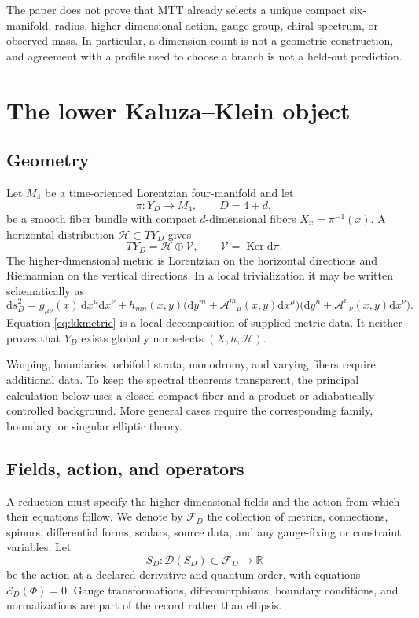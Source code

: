 \documentclass[11pt]{article}
\theoremstyle{definition}
\theoremstyle{remark}
\newcommand{\dd}{\mathrm d}
\newcommand{\cA}{\mathcal A}
\newcommand{\cD}{\mathcal D}
\newcommand{\cE}{\mathcal E}
\newcommand{\cF}{\mathcal F}
\newcommand{\cH}{\mathcal H}
\newcommand{\cV}{\mathcal V}
\newcommand{\Ker}{\operatorname{Ker}}
\begin{document}
The paper does not prove that MTT already selects a unique compact
six-manifold, radius, higher-dimensional action, gauge group, chiral
spectrum, or observed mass.  In particular, a dimension count is not a
geometric construction, and agreement with a profile used to choose a
branch is not a held-out prediction.

\section{The lower Kaluza--Klein object}
\label{sec:record}

\subsection{Geometry}

Let \(M_4\) be a time-oriented Lorentzian four-manifold and let
\[
  \pi:Y_D\longrightarrow M_4,\qquad D=4+d,
\]
be a smooth fiber bundle with compact \(d\)-dimensional fibers
\(X_x=\pi^{-1}(x)\).  A horizontal distribution
\(\cH\subset TY_D\) gives
\[
  TY_D=\cH\oplus\cV,\qquad \cV=\Ker\dd\pi .
\]
The higher-dimensional metric is Lorentzian on the horizontal directions
and Riemannian on the vertical directions.  In a local trivialization it may
be written schematically as
\begin{equation}
\label{eq:kkmetric}
\dd s_D^2
 =g_{\mu\nu}(x)\,\dd x^\mu\dd x^\nu
 +h_{mn}(x,y)
   \bigl(\dd y^m+\cA^m{}_\mu(x,y)\dd x^\mu\bigr)
   \bigl(\dd y^n+\cA^n{}_\nu(x,y)\dd x^\nu\bigr).
\end{equation}
Equation \eqref{eq:kkmetric} is a local decomposition of supplied metric
data.  It neither proves that \(Y_D\) exists globally nor selects
\((X,h,\cH)\).

Warping, boundaries, orbifold strata, monodromy, and varying fibers require
additional data.  To keep the spectral theorems transparent, the principal
calculation below uses a closed compact fiber and a product or
adiabatically controlled background.  More general cases require the
corresponding family, boundary, or singular elliptic theory.

\subsection{Fields, action, and operators}

A reduction must specify the higher-dimensional fields and the action from
which their equations follow.  We denote by \(\cF_D\) the collection of
metrics, connections, spinors, differential forms, scalars, source data, and
any gauge-fixing or constraint variables.  Let
\[
 S_D:\cD(S_D)\subset\cF_D\longrightarrow\mathbb R
\]
be the action at a declared derivative and quantum order, with equations
\(\cE_D(\Phi)=0\).  Gauge transformations, diffeomorphisms, boundary
conditions, and normalizations are part of the record rather than
ellipsis.
\end{document}
